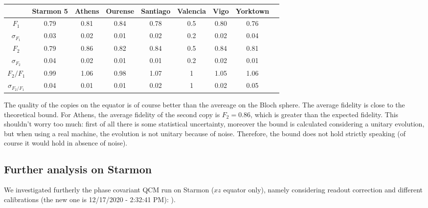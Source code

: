 \documentclass[11pt]{article}
\begin{document}
\begin{table}[H]
    \centering
    \begin{tabular}{|c|c|c|c|c|c|c|c|c|}
    \hline
    \textbf{} & \textbf{Starmon 5} & \textbf{Athens} & \textbf{Ourense} & \textbf{Santiago} & \textbf{Valencia} & \textbf{Vigo} & \textbf{Yorktown} \\ \hline
    $F_1$              & 0.79 & 0.81 & 0.84 & 0.78 & 0.5 & 0.80 & 0.76 \\ \hline
    $\sigma_{F_1}$     & 0.03 & 0.02 & 0.01 & 0.02 & 0.2 & 0.02 & 0.04 \\ \hline
    $F_2$              & 0.79 & 0.86 & 0.82 & 0.84 & 0.5 & 0.84 & 0.81 \\ \hline
    $\sigma_{F_2}$     & 0.04 & 0.02 & 0.01 & 0.01 & 0.2 & 0.02 & 0.01 \\ \hline
    $F_2/F_1$          & 0.99 & 1.06 & 0.98 & 1.07 & 1 & 1.05 & 1.06 \\ \hline
    $\sigma_{F_2/F_1}$ & 0.04 & 0.01 & 0.01 & 0.02 & 1 & 0.02 & 0.05 \\ \hline
    \end{tabular}
\end{table}
The quality of the copies on the equator is of course better than the avereage on the Bloch sphere. The average fidelity is close to the theoretical bound.
For Athens, the average fidelity of the second copy is $F_2=0.86$, which is greater than the expected fidelity.
This shouldn't worry too much: first of all there is some statistical uncertainty, moreover the bound is calculated considering a unitary evolution, but when using a real machine, the evolution is not unitary because of noise.
Therefore, the bound does not hold strictly speaking (of course it would hold in absence of noise).

\subsection{Further analysis on Starmon}
We investigated furtherly the phase covariant QCM run on Starmon ($xz$ equator only), namely considering readout correction and different calibrations (the new one is 12/17/2020 - 2:32:41 PM):
).
\end{document}
